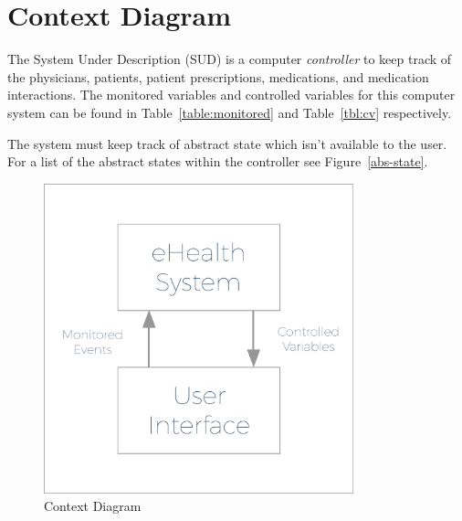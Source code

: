 \section{Context Diagram}
 
The System Under Description (SUD) is a computer \emph{controller} to keep track of the physicians, patients, patient prescriptions, medications, and medication interactions. The monitored variables and controlled variables for this computer system can be found in Table~\ref{table:monitored} and 
Table~\ref{tbl:cv} respectively. 

The system must keep track of abstract state which isn't available to the user. For a list of the abstract states within the controller see Figure~\ref{abs-state}.

\begin{figure}[htb]
\begin{center}
\includegraphics[width=0.8\textwidth]{pics/ContextDiagramExpanded.pdf}
\end{center}
\caption{Context Diagram}
\label{fig:modes}
\end{figure}